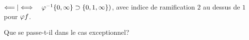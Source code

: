 $\Longleftarrow|\Longleftrightarrow\quad\varphi^{-1}\{0,\infty\}\supset\{0,1,\infty\})$,
avec indice de
ramification $2$ au dessus de $1$ pour $\varphi f$.

 Que se passe-t-il dans le cas exceptionnel?
